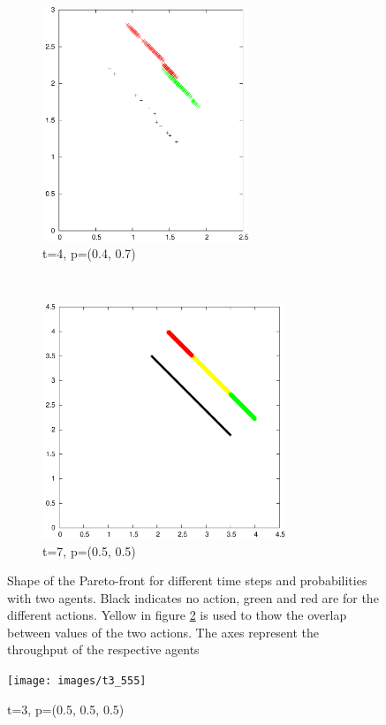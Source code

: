 \documentclass{article}
\begin{document}
\begin{figure}
		\begin{subfigure}[b]{0.45\textwidth}
			\centering
			\includegraphics[width=\textwidth,height=7cm,keepaspectratio]{images/t4_47}
			\caption{t=4, p=(0.4, 0.7)}
			\label{fig:t4_47}
		\end{subfigure}
		~
		\begin{subfigure}[b]{0.45\textwidth}
			\centering
			\includegraphics[width=\textwidth,height=7cm,keepaspectratio]{images/t7_55}
			\caption{t=7, p=(0.5, 0.5)}
			\label{fig:t7_55}
		\end{subfigure}
		\caption{Shape of the Pareto-front for different time steps and
			probabilities with two agents. Black indicates no action, green and
			red are for the different actions. Yellow in figure \ref{fig:t7_55} is
			used to thow the overlap between values of the two actions. The axes
			represent the throughput of the respective agents}
		\label{fig:many_fronts}
	\end{figure}

	\begin{figure}
		\centering
		\texttt{[image: images/t3\_555]}
		\caption{t=3, p=(0.5, 0.5, 0.5)}
		\label{fig:t3_555}
	\end{figure}
	\restoregeometry
\end{document}
